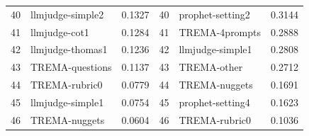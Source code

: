 \begin{table}[h]
\begin{tabular}{rlc|rlc}
40 & llmjudge-simple2 & 0.1327 & 40 & prophet-setting2 & 0.3144 \\
41 & llmjudge-cot1 & 0.1284 & 41 & TREMA-4prompts & 0.2888 \\
42 & llmjudge-thomas1 & 0.1236 & 42 & llmjudge-simple1 & 0.2808 \\
43 & TREMA-questions & 0.1137 & 43 & TREMA-other & 0.2712 \\
44 & TREMA-rubric0 & 0.0779 & 44 & TREMA-nuggets & 0.1691 \\
45 & llmjudge-simple1 & 0.0754 & 45 & prophet-setting4 & 0.1623 \\
46 & TREMA-nuggets & 0.0604 & 46 & TREMA-rubric0 & 0.1036 \\
\bottomrule
\end{tabular}
\end{table}